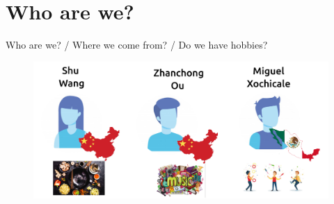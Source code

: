 \section{Who are we?}


{
\begin{frame}{Who are we? / Where we come from? / Do we have hobbies?}

  \begin{figure}
  \centering
  \includegraphics[width=1.0\textwidth]{./figures/who-we-are/versions/drawing-v01.png}
  \end{figure}

\end{frame}
}


